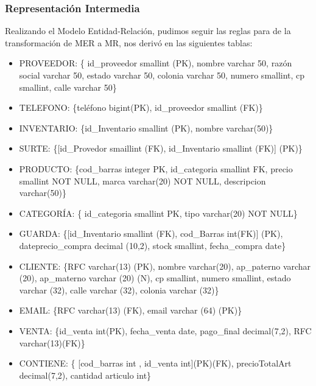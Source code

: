 \documentclass[12pt,letterpaper]{article}
\begin{document}
	\subsubsection{Representación Intermedia}
	Realizando el Modelo Entidad-Relación, pudimos seguir las reglas para de la transformación de MER a MR, nos derivó en las siguientes tablas:
	\begin{itemize}
		\item PROVEEDOR: \{ id\_proveedor smallint (PK), nombre varchar 50, razón social varchar 50, estado varchar 50, colonia varchar 50, numero smallint, cp smallint, calle varchar 50\}
		
		\item TELEFONO: \{teléfono bigint(PK), id\_proveedor smallint (FK)\}
		
		\item INVENTARIO: \{id\_Inventario smallint (PK), nombre varchar(50)\}
		
		
		\item SURTE: \{[id\_Provedor smaillint (FK), id\_Inventario smallint (FK)] (PK)\}
		
		\item PRODUCTO: \{cod\_barras integer PK, id\_categoria smallint FK, precio smallint NOT NULL, marca varchar(20) NOT NULL, descripcion varchar(50)\}
		
		\item CATEGORÍA: \{ id\_categoria smallint PK, tipo varchar(20) NOT NULL\}
		
		\item GUARDA: \{[id\_Inventario smallint (FK), cod\_Barras int(FK)] (PK), dateprecio\_compra decimal (10,2), stock smallint, fecha\_compra date\}
		
		\item CLIENTE: \{RFC varchar(13) (PK), nombre varchar(20), ap\_paterno varchar (20), ap\_materno varchar (20) (N), cp smallint, numero smallint, estado varchar (32), calle varchar (32), colonia varchar (32)\}
		
		\item EMAIL: \{RFC varchar(13) (FK), email varchar (64) (PK)\}
		
		\item VENTA: \{id\_venta int(PK), fecha\_venta date, pago\_final decimal(7,2), RFC varchar(13)(FK)\}
		
		\item CONTIENE: \{ [cod\_barras int , id\_venta int](PK)(FK), precioTotalArt decimal(7,2), cantidad articulo int\} 
	\end{itemize}
	
\end{document}
